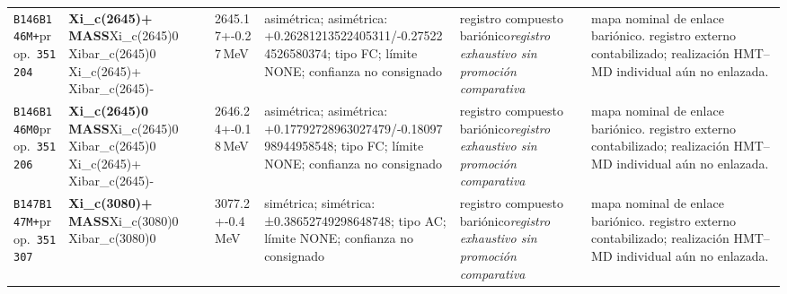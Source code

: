 \begin{landscape}
\begin{longtable}{L{1.85cm}L{4.45cm}L{2.35cm}L{4.05cm}L{3.35cm}L{7.15cm}}
\texttt{B146}\newline \texttt{B146M+}\newline prop.\ \texttt{351204} & \textbf{Xi\_\allowbreak{}c(2645)+ MASS}\newline Xi\_\allowbreak{}c(2645)0 \textbar{}\allowbreak{} Xibar\_\allowbreak{}c(2645)0 \textbar{}\allowbreak{} Xi\_\allowbreak{}c(2645)+ \textbar{}\allowbreak{} Xibar\_\allowbreak{}c(2645)- & 2645.17+-0.27\,MeV & asimétrica; asimétrica: +0.26281213522405311/-0.275224526580374; tipo FC; límite NONE; confianza no consignado & registro compuesto bariónico\newline \emph{registro exhaustivo sin promoción comparativa} & mapa nominal de enlace bariónico. registro externo contabilizado; realización HMT--MD individual aún no enlazada. \\
\texttt{B146}\newline \texttt{B146M0}\newline prop.\ \texttt{351206} & \textbf{Xi\_\allowbreak{}c(2645)0 MASS}\newline Xi\_\allowbreak{}c(2645)0 \textbar{}\allowbreak{} Xibar\_\allowbreak{}c(2645)0 \textbar{}\allowbreak{} Xi\_\allowbreak{}c(2645)+ \textbar{}\allowbreak{} Xibar\_\allowbreak{}c(2645)- & 2646.24+-0.18\,MeV & asimétrica; asimétrica: +0.17792728963027479/-0.1809798944958548; tipo FC; límite NONE; confianza no consignado & registro compuesto bariónico\newline \emph{registro exhaustivo sin promoción comparativa} & mapa nominal de enlace bariónico. registro externo contabilizado; realización HMT--MD individual aún no enlazada. \\
\texttt{B147}\newline \texttt{B147M+}\newline prop.\ \texttt{351307} & \textbf{Xi\_\allowbreak{}c(3080)+ MASS}\newline Xi\_\allowbreak{}c(3080)0 \textbar{}\allowbreak{} Xibar\_\allowbreak{}c(3080)0 & 3077.2+-0.4\,MeV & simétrica; simétrica: ±0.38652749298648748; tipo AC; límite NONE; confianza no consignado & registro compuesto bariónico\newline \emph{registro exhaustivo sin promoción comparativa} & mapa nominal de enlace bariónico. registro externo contabilizado; realización HMT--MD individual aún no enlazada. \\

\end{longtable}
\end{landscape}
